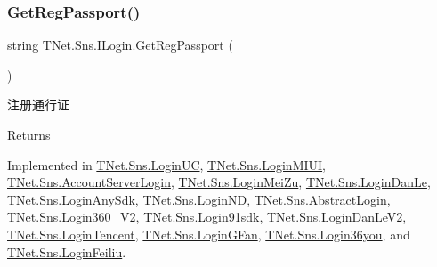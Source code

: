 \mbox{\label{interface_t_net_1_1_sns_1_1_i_login_a74bd2db9f18c212d23fa01462bb0a845}} 
\subsubsection{\texorpdfstring{Get\+Reg\+Passport()}{GetRegPassport()}}
{\footnotesize\ttfamily string T\+Net.\+Sns.\+I\+Login.\+Get\+Reg\+Passport (\begin{DoxyParamCaption}{ }\end{DoxyParamCaption})}



注册通行证 

\begin{DoxyReturn}{Returns}

\end{DoxyReturn}


Implemented in \mbox{\hyperlink{class_t_net_1_1_sns_1_1_login_u_c_a6ba22f5ef4dbee94a5f59020d79f4b58}{T\+Net.\+Sns.\+Login\+UC}}, \mbox{\hyperlink{class_t_net_1_1_sns_1_1_login_m_i_u_i_a600a638293acdeb2e299f047b7f339f5}{T\+Net.\+Sns.\+Login\+M\+I\+UI}}, \mbox{\hyperlink{class_t_net_1_1_sns_1_1_account_server_login_afb41f63a3d82a333820da668c2eaf289}{T\+Net.\+Sns.\+Account\+Server\+Login}}, \mbox{\hyperlink{class_t_net_1_1_sns_1_1_login_mei_zu_a1a3c3c30ba18024e819f0aa8518eedb8}{T\+Net.\+Sns.\+Login\+Mei\+Zu}}, \mbox{\hyperlink{class_t_net_1_1_sns_1_1_login_dan_le_a8f4d8299a72d87be61454902c240f2a2}{T\+Net.\+Sns.\+Login\+Dan\+Le}}, \mbox{\hyperlink{class_t_net_1_1_sns_1_1_login_any_sdk_a70ac7a7b2956ddc6c3d9c7bbba4d99c5}{T\+Net.\+Sns.\+Login\+Any\+Sdk}}, \mbox{\hyperlink{class_t_net_1_1_sns_1_1_login_n_d_a3f84b2292edbc7310abbe64f757f37db}{T\+Net.\+Sns.\+Login\+ND}}, \mbox{\hyperlink{class_t_net_1_1_sns_1_1_abstract_login_a3930eb564bb4804e1b646d749f20907a}{T\+Net.\+Sns.\+Abstract\+Login}}, \mbox{\hyperlink{class_t_net_1_1_sns_1_1_login360___v2_a81e62cff8c92b5b35e922e2948202d8a}{T\+Net.\+Sns.\+Login360\+\_\+\+V2}}, \mbox{\hyperlink{class_t_net_1_1_sns_1_1_login91sdk_a036829f25d9543f335e23a33bcf229b6}{T\+Net.\+Sns.\+Login91sdk}}, \mbox{\hyperlink{class_t_net_1_1_sns_1_1_login_dan_le_v2_a10382c3e563022d2f0c4f37769f35107}{T\+Net.\+Sns.\+Login\+Dan\+Le\+V2}}, \mbox{\hyperlink{class_t_net_1_1_sns_1_1_login_tencent_abc09c476353f85c5e8a135d235bcb5c6}{T\+Net.\+Sns.\+Login\+Tencent}}, \mbox{\hyperlink{class_t_net_1_1_sns_1_1_login_g_fan_aaa467dca1a6f8fc8eb55139f9bfad0ca}{T\+Net.\+Sns.\+Login\+G\+Fan}}, \mbox{\hyperlink{class_t_net_1_1_sns_1_1_login36you_a01060a26e8212aaac7e29b634263001a}{T\+Net.\+Sns.\+Login36you}}, and \mbox{\hyperlink{class_t_net_1_1_sns_1_1_login_feiliu_a9a146d3872f6c613a650ad832fd2d68b}{T\+Net.\+Sns.\+Login\+Feiliu}}.



